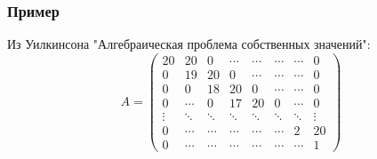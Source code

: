 \subsubsection{Пример}
Из Уилкинсона "Алгебраическая проблема собственных значений": \\
    \[
    A = 
    \begin{pmatrix}
    20 & 20 & 0 &\cdots & \cdots &\cdots & \cdots &0  \\
    0 & 19 & 20 & 0 & \cdots &\cdots  & \cdots & 0\\
    0 & 0 & 18 & 20 & 0 &\cdots & \cdots & 0\\
    0 &\cdots& 0 & 17 & 20 & 0 & \cdots & 0\\
    \vdots & \ddots & \ddots & \ddots & \ddots & \ddots & \ddots & \vdots \\

    0 & \cdots & \cdots & \cdots & \cdots & \cdots & 2 & 20 \\
    0 & \cdots & \cdots & \cdots & \cdots & \cdots & \cdots & 1
    \end{pmatrix}
    \]

